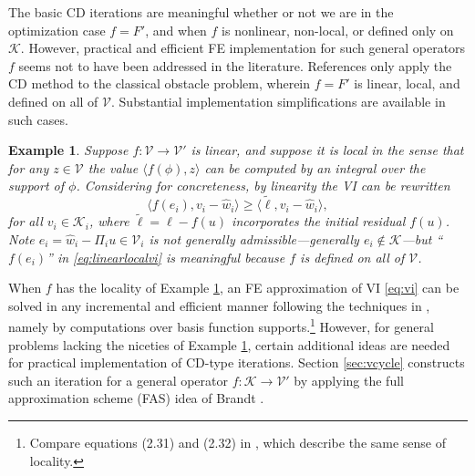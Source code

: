 \documentclass[letterpaper,final,12pt,reqno]{amsart}
\theoremstyle{cstyle}
\theoremstyle{cstyle*}
\theoremstyle{dstyle}
\newtheorem{example}[theorem]{Example}
\numberwithin{equation}{section}
\numberwithin{figure}{section}
\numberwithin{table}{section}
\numberwithin{theorem}{section}
\newcommand{\cK}{\mathcal{K}}
\newcommand{\cV}{\mathcal{V}}
\newcommand{\ip}[2]{\langle#1,#2\rangle}
\begin{document}
The basic CD iterations are meaningful whether or not we are in the optimization case $f=F'$, and when $f$ is nonlinear, non-local, or defined only on $\cK$.  However, practical and efficient FE implementation for such general operators $f$ seems not to have been addressed in the literature.  References \cite{GraeserKornhuber2009,Tai2003} only apply the CD method to the classical obstacle problem, wherein $f=F'$ is linear, local, and defined on all of $\mathcal{V}$. Substantial implementation simplifications are available in such cases.

\begin{example}  \label{ex:fnice} Suppose $f:\cV \to \cV'$ is linear, and suppose it is local in the sense that for any $z\in\mathcal{V}$ the value $\ip{f(\phi)}{z}$ can be computed by an integral over the support of $\phi$.  Considering  for concreteness, by linearity the VI can be rewritten
\begin{equation}
\ip{f(e_i)}{v_i-\hat w_i} \ge \ip{\tilde\ell}{v_i-\hat w_i}, \label{eq:linearlocalvi}
\end{equation}
for all $v_i \in \mathcal{K}_i$, where $\tilde\ell = \ell - f(u)$ incorporates the initial residual $f(u)$.  Note $e_i = \hat w_i - \Pi_i u \in \cV_i$ is not generally admissible---generally $e_i \notin \cK$---but ``$f(e_i)$'' in \eqref{eq:linearlocalvi} is meaningful because $f$ is defined on all of $\cV$.
\end{example}

When $f$ has the locality of Example \ref{ex:fnice}, an FE approximation of VI \eqref{eq:vi} can be solved in any incremental and efficient manner following the techniques in \cite{GraeserKornhuber2009,Tai2003}, namely by computations over basis function supports.\footnote{Compare equations (2.31) and (2.32) in \cite{Farrelletal2021}, which describe the same sense of locality.}  However, for general problems lacking the niceties of Example \ref{ex:fnice}, certain additional ideas are needed for practical implementation of CD-type iterations.  Section \ref{sec:vcycle} constructs such an iteration for a general operator $f:\cK\to\cV'$ by applying the full approximation scheme (FAS) idea of Brandt \cite{Brandt1977}.
\end{document}
